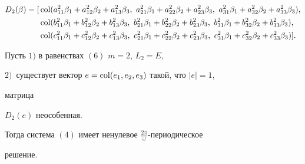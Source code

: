 \begin{align*} 


D_2(\beta)=[ & \col(a^2_{11}\beta_1+a^2_{12}\beta_2+ 


a^2_{13}\beta_3,\ a^2_{21}\beta_1+ 


a^2_{22}\beta_2+a^2_{23}\beta_3,\ 


a^2_{31}\beta_1+a^2_{32}\beta_2+ 


a^2_{33}\beta_3),\\ 


%


& \col(b^2_{11}\beta_1+b^2_{12}\beta_2+ 


b^2_{13}\beta_3,\ b^2_{21}\beta_1+ 


b^2_{22}\beta_2+b^2_{23}\beta_3,\ 


b^2_{31}\beta_1+b^2_{32}\beta_2+ 


b^2_{33}\beta_3),\\ 


%


& \col(c^2_{11}\beta_1+c^2_{12}\beta_2+ 


c^2_{13}\beta_3,\ c^2_{21}\beta_1+ 


c^2_{22}\beta_2+c^2_{23}\beta_3,\ 


c^2_{31}\beta_1+c^2_{32}\beta_2+ 


c^2_{33}\beta_3)]. 


\end{align*} 


 


\begin{thm} 


Пусть $1)$ в равенствах $(6)$ $m=2$, $L_2=E$, 





$2)$~существует вектор $e=\operatorname{col}(e_1,e_2,e_3)$ такой, что $|e|=1$, 


матрица 


$D_2(e)$ неособенная. 





Тогда система $(4)$ имеет ненулевое $\frac{2\pi}{\omega}$-периодическое 


решение. 


\end{thm} 


 


